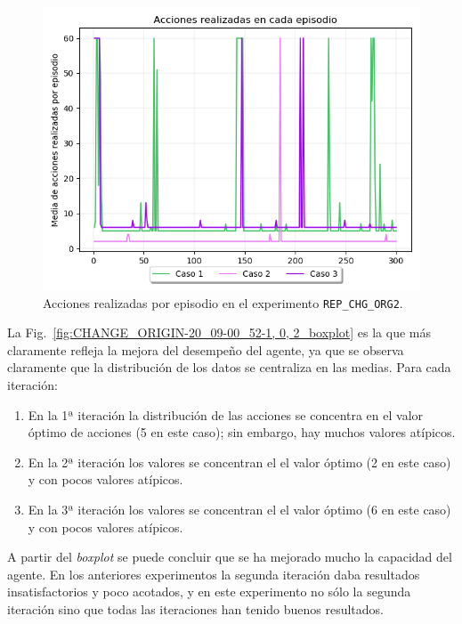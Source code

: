   \begin{figure}
    \centering
    \includegraphics[scale=0.4]{cap5_experimentacion/images/CHANGE_ORIGIN-20_09-00_52-1, 0, 2_acciones.png}
    \caption{Acciones realizadas por episodio en el experimento \texttt{REP\_CHG\_ORG2}.}
    \label{fig:CHANGE_ORIGIN-20_09-00_52-1, 0, 2_acciones}
\end{figure}

La Fig.~\ref{fig:CHANGE_ORIGIN-20_09-00_52-1, 0, 2_boxplot} es la que más claramente refleja la mejora del desempeño del agente, ya que se observa claramente que la distribución de los datos se centraliza en las medias. Para cada iteración: 
\begin{enumerate}
    \item En la 1ª iteración la distribución de las acciones se concentra en el valor óptimo de acciones (5 en este caso); sin embargo, hay muchos valores atípicos.
    \item En la 2ª iteración los valores se concentran el el valor óptimo (2 en este caso) y con pocos valores atípicos.
    \item En la 3ª iteración los valores se concentran el el valor óptimo (6 en este caso) y con pocos valores atípicos.  
\end{enumerate}

A partir del \textit{boxplot} se puede concluir que se ha mejorado mucho la capacidad del agente. En los anteriores experimentos la segunda iteración daba resultados insatisfactorios y poco acotados, y en este experimento no sólo la segunda iteración sino que todas las iteraciones han tenido buenos resultados. \\
 
